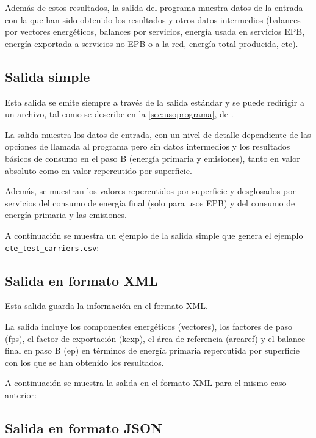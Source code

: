 \documentclass[10pt,notitlepage,oneside,a4paper]{article}
\begin{document}
Además de estos resultados, la salida del programa muestra datos de la entrada con la que han sido obtenido los resultados y otros datos intermedios (balances por vectores energéticos, balances por servicios, energía usada en servicios EPB, energía exportada a servicios no EPB o a la red, energía total producida, etc).

\subsection{Salida simple}

Esta salida se emite siempre a través de la salida estándar y se puede redirigir a un archivo, tal como se describe en la \autoref{sec:usoprograma}, de .

La salida muestra los datos de entrada, con un nivel de detalle dependiente de las opciones de llamada al programa pero sin datos intermedios y los resultados básicos de consumo en el paso B (energía primaria y emisiones), tanto en valor absoluto como en valor repercutido por superficie.

Además, se muestran los valores repercutidos por superficie y desglosados por servicios del consumo de energía final (solo para usos EPB) y del consumo de energía primaria y las emisiones.

A continuación se muestra un ejemplo de la salida simple que genera el ejemplo \texttt{cte\_test\_carriers.csv}:



\newpage
\subsection{Salida en formato XML}
\label{subsec:formatoxml}

Esta salida guarda la información en el formato XML.

La salida incluye los componentes energéticos (vectores), los factores de paso (fps), el factor de exportación (kexp), el área de referencia (arearef) y el balance final en paso B (ep) en términos de energía primaria repercutida por superficie  con los que se han obtenido los resultados.

A continuación se muestra la salida en el formato XML para el mismo caso anterior:



\newpage
\subsection{Salida en formato JSON}
\label{subsec:formatojson}
\end{document}
